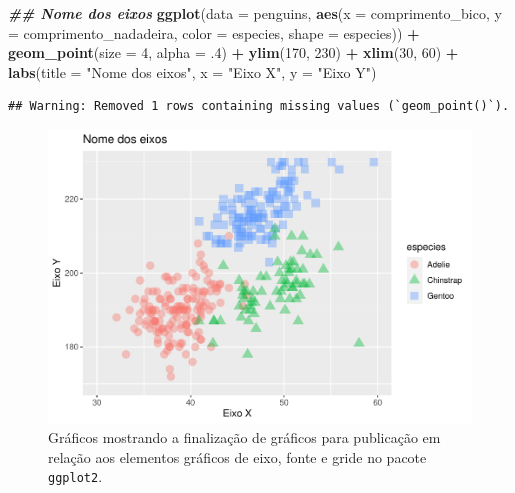 \documentclass[
]{article}
\newenvironment{Shaded}{\begin{snugshade}}{\end{snugshade}}
\newcommand{\AttributeTok}[1]{\textcolor[rgb]{0.13,0.29,0.53}{#1}}
\newcommand{\DecValTok}[1]{\textcolor[rgb]{0.00,0.00,0.81}{#1}}
\newcommand{\DocumentationTok}[1]{\textcolor[rgb]{0.56,0.35,0.01}{\textbf{\textit{#1}}}}
\newcommand{\FunctionTok}[1]{\textcolor[rgb]{0.13,0.29,0.53}{\textbf{#1}}}
\newcommand{\NormalTok}[1]{#1}
\newcommand{\SpecialCharTok}[1]{\textcolor[rgb]{0.81,0.36,0.00}{\textbf{#1}}}
\newcommand{\StringTok}[1]{\textcolor[rgb]{0.31,0.60,0.02}{#1}}
\begin{document}
\begin{Shaded}
\begin{Highlighting}[]
\DocumentationTok{\#\# Nome dos eixos}
\FunctionTok{ggplot}\NormalTok{(}\AttributeTok{data =}\NormalTok{ penguins,  }
       \FunctionTok{aes}\NormalTok{(}\AttributeTok{x =}\NormalTok{ comprimento\_bico, }\AttributeTok{y =}\NormalTok{ comprimento\_nadadeira, }
           \AttributeTok{color =}\NormalTok{ especies, }\AttributeTok{shape =}\NormalTok{ especies)) }\SpecialCharTok{+}
    \FunctionTok{geom\_point}\NormalTok{(}\AttributeTok{size =} \DecValTok{4}\NormalTok{, }\AttributeTok{alpha =}\NormalTok{ .}\DecValTok{4}\NormalTok{) }\SpecialCharTok{+}
    \FunctionTok{ylim}\NormalTok{(}\DecValTok{170}\NormalTok{, }\DecValTok{230}\NormalTok{) }\SpecialCharTok{+}
    \FunctionTok{xlim}\NormalTok{(}\DecValTok{30}\NormalTok{, }\DecValTok{60}\NormalTok{) }\SpecialCharTok{+}
    \FunctionTok{labs}\NormalTok{(}\AttributeTok{title =} \StringTok{"Nome dos eixos"}\NormalTok{, }\AttributeTok{x =} \StringTok{"Eixo X"}\NormalTok{, }\AttributeTok{y =} \StringTok{"Eixo Y"}\NormalTok{)}
\end{Highlighting}
\end{Shaded}

\begin{verbatim}
## Warning: Removed 1 rows containing missing values (`geom_point()`).
\end{verbatim}

\begin{figure}
\centering
\includegraphics{epr_files/figure-latex/fig-plot-final-eixos-1.pdf}
\caption{\label{fig:fig-plot-final-eixos-1}Gráficos mostrando a finalização de gráficos para publicação em relação aos elementos gráficos de eixo, fonte e gride no pacote \texttt{ggplot2}.}
\end{figure}
\end{document}
